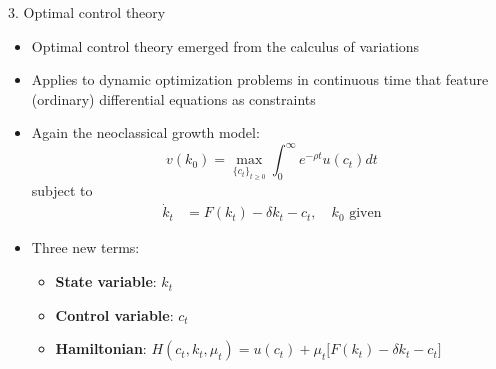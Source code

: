 \documentclass[10pt]{beamer}
\begin{document}
\begin{frame}{3. Optimal control theory}
\begin{itemize}
\item Optimal control theory emerged from the calculus of variations

\item Applies to dynamic optimization problems in continuous time that feature (ordinary) differential equations as constraints

\item Again the neoclassical growth model:
\begin{equation*}
	v(k_0) = \max_{\{ c_t \}_{t \geq 0} } \int_0^\infty e^{-\rho t} u(c_t) dt
\end{equation*}
subject to
\begin{align*}
	\dot k_t &= F(k_t) - \delta k_t - c_t,  \quad k_0 \text{ given}
\end{align*}

\item Three new terms: 
\begin{itemize}
\vspace{1mm}
\item \textbf{State variable}: $k_t$

\vspace{-2mm}
\item \textbf{Control variable}: $c_t$

\vspace{-2mm}
\item \textbf{Hamiltonian}: $H(c_t, k_t, \mu_t) = u(c_t) + \mu_t \big[ F(k_t) - \delta k_t - c_t \big]$
\end{itemize}
\end{itemize}	
\end{frame}
\end{document}
